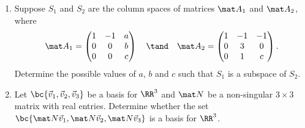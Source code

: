 \begin{problem}
    \begin{enumerate}
        \item Suppose $S_1$ and $S_2$ are the column spaces of matrices $\mat A_1$ and $\mat A_2$, where \[\mat A_1 = \begin{pmatrix}1 & -1 & a \\ 0 & 0 & b \\ 0 & 0 & c\end{pmatrix} \quad \tand \quad \mat A_2 = \begin{pmatrix}1 & -1 & -1 \\ 0 & 3 & 0 \\ 0 & 1 & c\end{pmatrix}.\] Determine the possible values of $a$, $b$ and $c$ such that $S_1$ is a subspace of $S_2$.
        \item Let $\bc{\vec v_1, \vec v_2, \vec v_3}$ be a basis for $\RR^3$ and $\mat N$ be a non-singular $3 \times 3$ matrix with real entries. Determine whether the set $\bc{\mat N \vec v_1, \mat N \vec v_2, \mat N \vec v_3}$ is a basis for $\RR^3$.
    \end{enumerate}
\end{problem}

